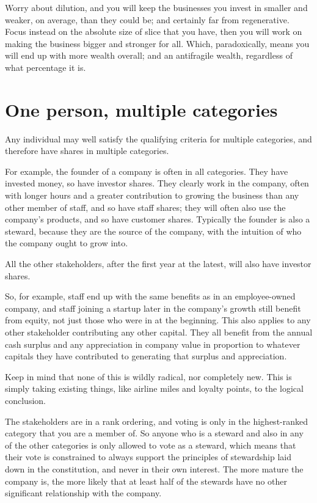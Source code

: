 Worry about dilution, and you will keep the businesses you invest in smaller and weaker, on average, than they could be; and certainly far from regenerative. Focus instead on the absolute size of slice that you have, then you will work on making the business bigger and stronger for all. Which, paradoxically, means you will end up with more wealth overall; and an antifragile wealth, regardless of what percentage it is. 
\section{One person, multiple categories}
Any individual may well satisfy the qualifying criteria for multiple categories, and therefore have shares in multiple categories.


For example, the founder of a company is often in all categories. They have invested money, so have investor shares. They clearly work in the company, often with longer hours and a greater contribution to growing the business than any other member of staff, and so have staff shares; they will often also use the company’s products, and so have customer shares. Typically the founder is also a steward, because they are the source of the company, with the intuition of who the company ought to grow into.


All the other stakeholders, after the first year at the latest, will also have investor shares. 


So, for example, staff end up with the same benefits as in an employee-owned company, and staff joining a startup later in the company's growth still benefit from equity, not just those who were in at the beginning. This also applies to any other stakeholder contributing any other capital. They all benefit from the annual cash surplus and any appreciation in company value in proportion to whatever capitals they have contributed to generating that surplus and appreciation.


Keep in mind that none of this is wildly radical, nor completely new. This is simply taking existing things, like airline miles and loyalty points, to the logical conclusion.


The stakeholders are in a rank ordering, and voting is only in the highest-ranked category that you are a member of. So anyone who is a steward and also in any of the other categories is only allowed to vote as a steward, which means that their vote is constrained to always support the principles of stewardship laid down in the constitution, and never in their own interest. The more mature the company is, the more likely that at least half of the stewards have no other significant relationship with the company.


